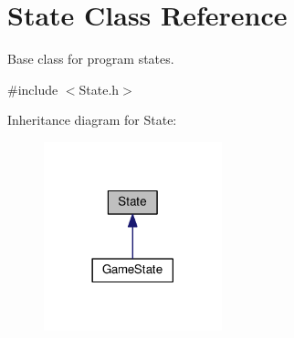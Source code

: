 \hypertarget{classState}{\section{State Class Reference}
\label{classState}
}


Base class for program states.  




{\ttfamily \#include $<$State.\-h$>$}



Inheritance diagram for State\-:
\nopagebreak
\begin{figure}[H]
\begin{center}
\leavevmode
\includegraphics[width=146pt]{classState__inherit__graph}
\end{center}
\end{figure}
